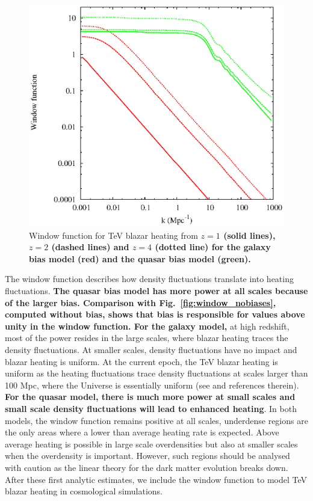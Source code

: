 \documentclass[twocolumns]{emulateapj}
\newcommand\ALc[1]{{\color{red} \bf #1}} %
\begin{document}
{\begin{figure}[h]
  \centering
  \includegraphics[width = .45\textwidth ]{window_gal_qso}
  \caption{Window function for TeV blazar heating from \ALc{$z=1$ (solid lines), $z=2$ (dashed lines) and $z=4$ (dotted line) for the galaxy bias model (red) and the quasar bias model (green).}}
  \label{fig:window}
\end{figure}

The window function describes how density fluctuations translate into heating fluctuations. \ALc{The quasar  bias model has more power at all scales because of the larger bias. Comparison with Fig.~\ref{fig:window_nobiases}, computed without bias, shows that bias is responsible for values above unity in the window function. For the galaxy model,} at high redshift, most of the power resides in the large scales, where blazar heating traces the density fluctuations. At smaller scales, density fluctuations have no impact and blazar heating is uniform. At the current epoch,  the TeV blazar heating is uniform as the heating fluctuations trace density fluctuations at scales larger than 100 Mpc, where the Universe is essentially uniform  (see \citet{2013MNRAS.429.2910C} and references therein). \ALc{For the quasar model, there is much more power at small scales and small scale density fluctuations will lead to enhanced heating}. In both models, the window function remains positive at all scales, underdense regions are the only areas where a lower than average heating rate is expected. Above average  heating is possible in large scale overdensities but also at  smaller scales when the overdensity is important.  However, such regions should be analysed with caution as the linear theory for the dark matter evolution breaks down. After these first analytic estimates, we include the window function to model TeV blazar heating in cosmological simulations. 





}
\end{document}
